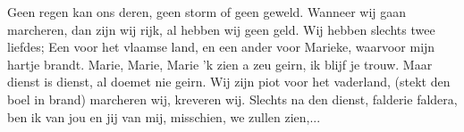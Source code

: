 \beginverse*
Geen regen kan ons deren, 
geen storm of geen geweld. 
Wanneer wij gaan marcheren, 
dan zijn wij rijk,
al hebben wij geen geld. 
Wij hebben slechts twee liefdes; 
Een voor het vlaamse land, 
en een ander voor Marieke, 
waarvoor mijn hartje brandt. 
Marie, Marie, Marie 'k zien a zeu geirn, 
ik blijf je trouw. Maar dienst is dienst, 
al doemet nie geirn. 
Wij zijn piot voor het vaderland, 
(stekt den boel in brand) 
marcheren wij, kreveren wij. 
Slechts na den dienst, 
falderie faldera, 
ben ik van jou en jij van mij, 
misschien, we zullen zien,...
\endverse
\endsong